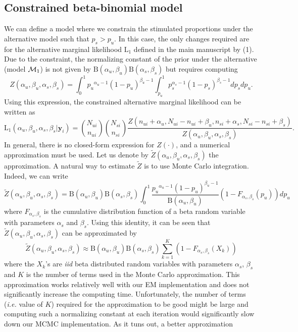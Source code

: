 \documentclass{article}
\begin{document}
\subsection{Constrained beta-binomial model}
\label{supp:constrained}
We can define a model where we constrain the stimulated proportions under the alternative model such that $p_s>p_u$. In this case, the only changes required are for the alternative marginal likelihood $\mathrm{L}_1$ defined in the main manuscript by (1). Due to the constraint, the normalizing constant of the prior under the alternative (model ${\cal M}_1$) is not given by $\mathrm{B}(\alpha_u,\beta_u)\mathrm{B}(\alpha_s,\beta_s)$ but requires computing \[
Z(\alpha_u, \beta_u, \alpha_s, \beta_s)=\int_{0}^1{p_u}^{\alpha_u-1}(1-p_u)^{\beta_u-1}\int_{p_u}^1 p_s^{\alpha_s-1}(1-p_s)^{\beta_s-1}dp_sdp_u.
\]
Using this expression, the constrained alternative marginal likelihood can be written as 
\[
\mathrm{L}_1(\alpha_u,\beta_u,\alpha_s,\beta_s|\mathbf{y}_i) 
=\binom{N_{ui}}{n_{ui}} \binom{N_{si}}{n_{si}}\frac{Z(n_{ui}+\alpha_u,N_{ui}-n_{ui}+\beta_u,n_{si}+\alpha_s,N_{si}-n_{si}+\beta_s)}{Z(\alpha_u,\beta_u,\alpha_s,\beta_s)}.
\label{model2:constrained}
\]
In general, there is no closed-form expression for $Z(\cdot)$, and a numerical approximation must be used. Let us denote by $\tilde{Z}(\alpha_u, \beta_u, \alpha_s, \beta_s)$ the approximation. A natural way to estimate $\tilde{Z}$ is to use Monte Carlo integration. Indeed, we can write 
\begin{equation}
\tilde{Z}(\alpha_u, \beta_u, \alpha_s, \beta_s)=\mathrm{B}(\alpha_u,\beta_u)\mathrm{B}(\alpha_s,\beta_s)\int_{0}^1\frac{{p_u}^{\alpha_u-1}(1-p_u)^{\beta_u-1}}{\mathrm{B}(\alpha_u,\beta_u)}(1-F_{\alpha_s,\beta_s}(p_u))dp_u
\label{equ:normZ}
\end{equation}
where $F_{\alpha_s,\beta_s}$ is the cumulative distribution function of a beta random variable with parameters $\alpha_s$ and $\beta_s$. Using this identity, it can be seen that $\tilde{Z}(\alpha_u, \beta_u, \alpha_s, \beta_s)$ can be approximated by 
\[
\tilde{Z}(\alpha_u, \beta_u, \alpha_s, \beta_s)\approx\mathrm{B}(\alpha_u,\beta_u)\mathrm{B}(\alpha_s,\beta_s)\sum_{k=1}^K(1-F_{\alpha_s,\beta_s}(X_k))
\]
where the $X_k$'s are \textit{iid} beta distributed random variables with parameters $\alpha_s$, $\beta_s$ and $K$ is the number of terms used in the Monte Carlo approximation. This approximation works relatively well with our EM implementation and does not significantly increase the computing time.
Unfortunately, the number of terms (\textit{i.e.} value of $K$) required for the approximation to be good might be large and computing such a normalizing constant at each iteration would significantly slow down our MCMC implementation. As it tuns out, a better approximation
\end{document}
